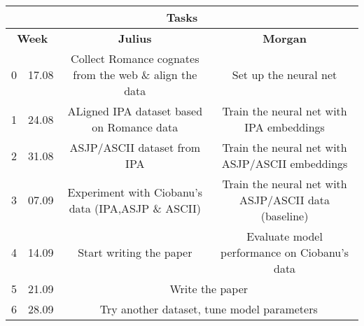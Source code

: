 \documentclass[a4paper, 14pt]{article}
\begin{document}
\begin{landscape}
\begin{tabular}{|l c|c|c|}
    \multicolumn{4}{c}{\textbf{Tasks}} \\
    \hline
    \multicolumn{2}{|c|}{\textbf{Week}} & \textbf{Julius} & \textbf{Morgan} \\
    \hline
    0 & 17.08 & Collect Romance cognates from the web \& align the data & Set up the neural net \\
    1 & 24.08 & ALigned IPA dataset based on Romance data & Train the neural net with IPA embeddings \\
    2 & 31.08 & ASJP/ASCII dataset from IPA & Train the neural net with ASJP/ASCII embeddings \\
    3 & 07.09 & Experiment with Ciobanu's data (IPA,ASJP \& ASCII) & Train the neural net with ASJP/ASCII data (baseline) \\
    4 & 14.09 & Start writing the paper & Evaluate model performance on Ciobanu's data \\
    5 & 21.09 & \multicolumn{2}{|c|}{Write the paper} \\
    6 & 28.09 & \multicolumn{2}{|c|}{Try another dataset, tune model parameters} \\
    \hline
\end{tabular}
\end{landscape}
\end{document}
